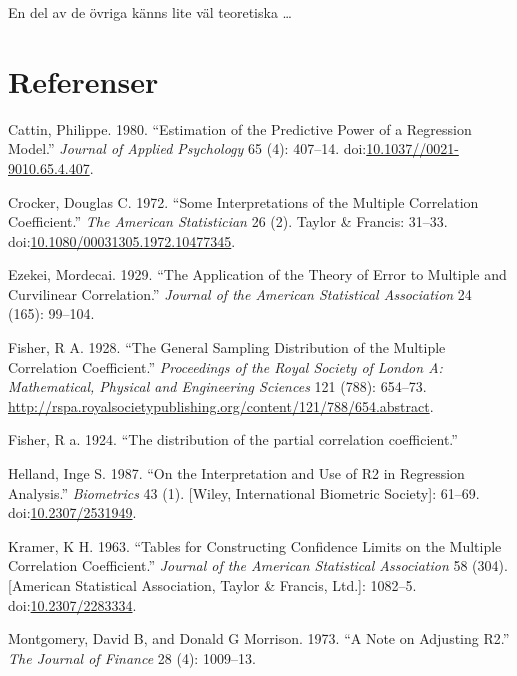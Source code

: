 \documentclass[]{article}
\begin{document}
En del av de övriga känns lite väl teoretiska \ldots{}

\section*{Referenser}\label{referenser}

\hypertarget{refs}{}
\hypertarget{ref-Cattin1980}{}
Cattin, Philippe. 1980. ``Estimation of the Predictive Power of a
Regression Model.'' \emph{Journal of Applied Psychology} 65 (4):
407--14.
doi:\href{https://doi.org/10.1037//0021-9010.65.4.407}{10.1037//0021-9010.65.4.407}.

\hypertarget{ref-Crocker1972}{}
Crocker, Douglas C. 1972. ``Some Interpretations of the Multiple
Correlation Coefficient.'' \emph{The American Statistician} 26 (2).
Taylor \& Francis: 31--33.
doi:\href{https://doi.org/10.1080/00031305.1972.10477345}{10.1080/00031305.1972.10477345}.

\hypertarget{ref-Ezekei1929}{}
Ezekei, Mordecai. 1929. ``The Application of the Theory of Error to
Multiple and Curvilinear Correlation.'' \emph{Journal of the American
Statistical Association} 24 (165): 99--104.

\hypertarget{ref-Fisher1928}{}
Fisher, R A. 1928. ``The General Sampling Distribution of the Multiple
Correlation Coefficient.'' \emph{Proceedings of the Royal Society of
London A: Mathematical, Physical and Engineering Sciences} 121 (788):
654--73.
\url{http://rspa.royalsocietypublishing.org/content/121/788/654.abstract}.

\hypertarget{ref-Fisher1924}{}
Fisher, R a. 1924. ``The distribution of the partial correlation
coefficient.''

\hypertarget{ref-Helland1987}{}
Helland, Inge S. 1987. ``On the Interpretation and Use of R2 in
Regression Analysis.'' \emph{Biometrics} 43 (1). {[}Wiley, International
Biometric Society{]}: 61--69.
doi:\href{https://doi.org/10.2307/2531949}{10.2307/2531949}.

\hypertarget{ref-Kramer1963}{}
Kramer, K H. 1963. ``Tables for Constructing Confidence Limits on the
Multiple Correlation Coefficient.'' \emph{Journal of the American
Statistical Association} 58 (304). {[}American Statistical Association,
Taylor \& Francis, Ltd.{]}: 1082--5.
doi:\href{https://doi.org/10.2307/2283334}{10.2307/2283334}.

\hypertarget{ref-Montgomery1973}{}
Montgomery, David B, and Donald G Morrison. 1973. ``A Note on Adjusting
R2.'' \emph{The Journal of Finance} 28 (4): 1009--13.
\end{document}
